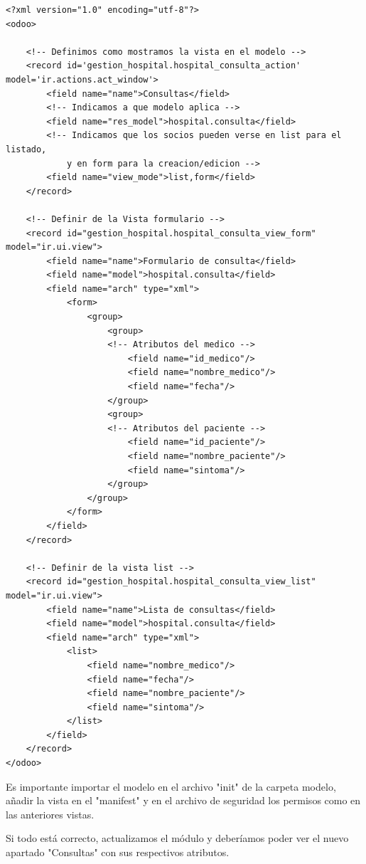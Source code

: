 \documentclass[a4paper,12pt]{article}
\begin{document}
\vspace{0.5cm}
\begin{lstlisting}[style=javascript]
<?xml version="1.0" encoding="utf-8"?>
<odoo>

    <!-- Definimos como mostramos la vista en el modelo -->
    <record id='gestion_hospital.hospital_consulta_action' model='ir.actions.act_window'>
        <field name="name">Consultas</field>
        <!-- Indicamos a que modelo aplica -->
        <field name="res_model">hospital.consulta</field>
        <!-- Indicamos que los socios pueden verse en list para el listado,
            y en form para la creacion/edicion -->
        <field name="view_mode">list,form</field>
    </record>

    <!-- Definir de la Vista formulario -->
    <record id="gestion_hospital.hospital_consulta_view_form" model="ir.ui.view">
        <field name="name">Formulario de consulta</field>
        <field name="model">hospital.consulta</field>
        <field name="arch" type="xml">
            <form>
                <group>
                    <group>
                    <!-- Atributos del medico -->
                        <field name="id_medico"/>
                        <field name="nombre_medico"/>
                        <field name="fecha"/>
                    </group>
                    <group>
                    <!-- Atributos del paciente -->
                        <field name="id_paciente"/>
                        <field name="nombre_paciente"/>
                        <field name="sintoma"/>
                    </group>
                </group>
            </form>
        </field>
    </record>

    <!-- Definir de la vista list -->
    <record id="gestion_hospital.hospital_consulta_view_list" model="ir.ui.view">
        <field name="name">Lista de consultas</field>
        <field name="model">hospital.consulta</field>
        <field name="arch" type="xml">
            <list>
                <field name="nombre_medico"/>
                <field name="fecha"/>                        
                <field name="nombre_paciente"/>
                <field name="sintoma"/>                        
            </list>
        </field>
    </record>
</odoo>
\end{lstlisting}

Es importante importar el modelo en el archivo "init" de la carpeta modelo, añadir la vista en el "manifest" y en el archivo de seguridad los permisos como en las anteriores vistas.

Si todo está correcto, actualizamos el módulo y deberíamos poder ver el nuevo apartado "Consultas" con sus respectivos atributos. 
\end{document}
